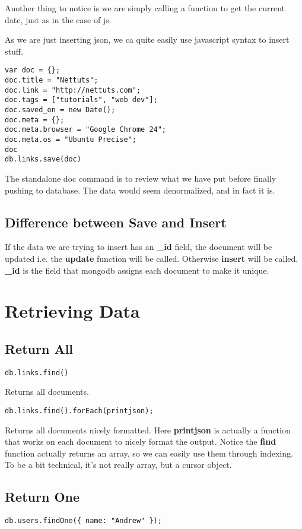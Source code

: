 \documentclass[a4paper, 12pt]{article}
\begin{document}
Another thing to notice is we are simply calling a function to get the current date, just as in the case of js.

As we are just inserting json, we ca quite easily use javascript syntax to insert stuff.
\begin{verbatim}
var doc = {};
doc.title = "Nettuts";
doc.link = "http://nettuts.com";
doc.tags = ["tutorials", "web dev"];
doc.saved_on = new Date();
doc.meta = {};
doc.meta.browser = "Google Chrome 24";
doc.meta.os = "Ubuntu Precise";
doc
db.links.save(doc)
\end{verbatim}
The standalone doc command is to review what we have put before finally pushing to database. The data would seem denormalized, and in fact it is.
\subsection{Difference between Save and Insert}
If the data we are trying to insert has an \textbf{\_id} field, the document will be updated i.e. the \textbf{update} function will be called. Otherwise \textbf{insert} will be called. \textbf{\_id} is the field that mongodb assigns each document to make it unique.

\section{Retrieving Data}
\subsection{Return All}
\begin{verbatim}
db.links.find()
\end{verbatim}
Returns all documents.
\begin{verbatim}
db.links.find().forEach(printjson);
\end{verbatim}
Returns all documents nicely formatted. Here \textbf{printjson} is actually a function that works on each document to nicely format the output. Notice the \textbf{find} function actually returns an array, so we can easily use them through indexing. To be a bit technical, it's not really array, but a cursor object. 
\subsection{Return One}
\begin{verbatim}
db.users.findOne({ name: "Andrew" });
\end{verbatim}
\end{document}
